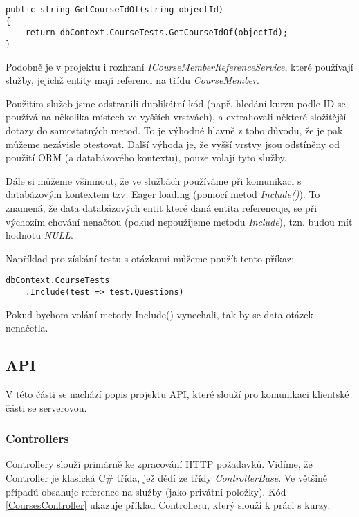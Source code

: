 \begin{lstlisting}
public string GetCourseIdOf(string objectId)
{
	return dbContext.CourseTests.GetCourseIdOf(objectId);
}
\end{lstlisting}

Podobně je v projektu i rozhraní \textit{ICourseMemberReferenceService}, které používají služby, jejichž entity mají referenci na třídu \textit{CourseMember}.

Použitím služeb jsme odstranili duplikátní kód (např. hledání kurzu podle ID se používá na několika místech ve vyšších vrstvách), a extrahovali některé složitější dotazy do samostatných metod. To je výhodné hlavně z toho důvodu, že je pak můžeme nezávisle otestovat. Další výhoda je, že vyšší vrstvy jsou odstíněny od použití ORM (a databázového kontextu), pouze volají tyto služby.

Dále si můžeme všimnout, že ve službách používáme při komunikaci s databázovým kontextem tzv. Eager loading (pomocí metod \textit{Include()}). To znamená, že data databázových entit které daná entita referencuje, se při výchozím chování nenačtou (pokud nepoužijeme metodu \textit{Include}), tzn. budou mít hodnotu \textit{NULL}.

Například pro získání testu s otázkami můžeme použít tento příkaz:
\begin{lstlisting}
dbContext.CourseTests
	.Include(test => test.Questions)
\end{lstlisting}
Pokud bychom volání metody Include() vynechali, tak by se data otázek nenačetla.

\subsection{API}
V této části se nachází popis projektu API, které slouží pro komunikaci klientské části se serverovou.

\subsubsection*{Controllers}
Controllery slouží primárně ke zpracování HTTP požadavků. Vidíme, že Controller je klasická C\# třída, jež dědí ze třídy \textit{ControllerBase}. Ve většině případů obsahuje reference na služby (jako privátní položky). Kód \ref{CoursesController} ukazuje příklad Controlleru, který slouží k práci s kurzy.


